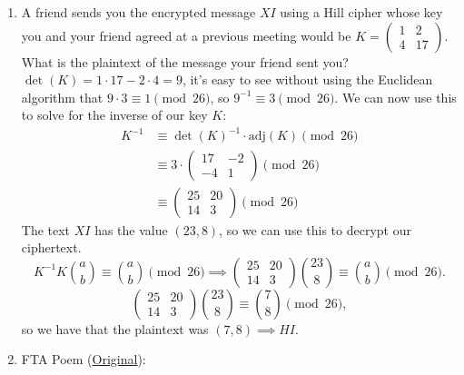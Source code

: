 \documentclass[11pt]{article}
\newcommand{\n}{\vspace{0.5cm}}
\begin{document}
\begin{enumerate}
\begin{enumerate}
      \end{enumerate}

    \newpage
    \item A friend sends you the encrypted message \(XI\) using a Hill cipher whose key you and your friend agreed at a previous meeting would be \(K = \begin{pmatrix} 1 & 2 \\ 4 & 17 \end{pmatrix}\).  What is the plaintext of the message your friend sent you? \n\\
      \(\det(K) = 1 \cdot 17 - 2 \cdot 4 = 9\), it's easy to see without using the Euclidean algorithm that \(9 \cdot 3 \equiv 1 \pmod{26}\), so \(9^{-1} \equiv 3 \pmod{26}\).
      We can now use this to solve for the inverse of our key \(K\):
      \begin{align*}
        K^{-1} &\equiv \det(K)^{-1} \cdot \text{adj}(K) \pmod{26} \\
               &\equiv 3 \cdot \begin{pmatrix} 17 & -2 \\ -4 & 1 \end{pmatrix} \pmod{26} \\
               &\equiv \begin{pmatrix} 25 & 20 \\ 14 & 3 \end{pmatrix} \pmod{26}
      \end{align*}
      The text \(XI\) has the value \((23,8)\), so we can use this to decrypt our ciphertext.
      \[K^{-1}K \binom ab \equiv \binom ab \pmod{26} \implies \begin{pmatrix} 25 & 20 \\ 14 & 3 \end{pmatrix} \binom{23}{8} \equiv \binom ab \pmod{26}.\]
      \[\begin{pmatrix} 25 & 20 \\ 14 & 3 \end{pmatrix} \binom{23}{8} \equiv \binom78 \pmod{26},\]
      so we have that the plaintext was \((7,8) \implies HI\). \n

    \item FTA Poem (\href{https://blogs.scientificamerican.com/roots-of-unity/prime-factorization-as-verse/}{Original}):


\end{enumerate}
\end{document}
